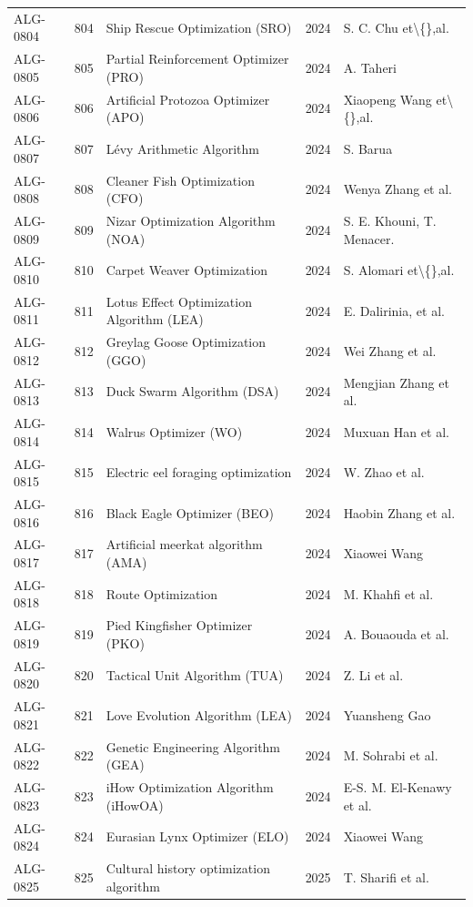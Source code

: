 \documentclass[8pt]{article}
\begin{document}
\begin{landscape}
\begin{longtable}{P{1.7cm}rP{10.0cm}rP{7.2cm}}
ALG-0804 & 804 & Ship Rescue Optimization (SRO) & 2024 & S. C. Chu et\textbackslash\{\},al. \\
ALG-0805 & 805 & Partial Reinforcement Optimizer (PRO) & 2024 & A. Taheri \\
ALG-0806 & 806 & Artificial Protozoa Optimizer (APO) & 2024 & Xiaopeng Wang et\textbackslash\{\},al. \\
ALG-0807 & 807 & Lévy Arithmetic Algorithm & 2024 & S. Barua \\
ALG-0808 & 808 & Cleaner Fish Optimization (CFO) & 2024 & Wenya Zhang et al. \\
ALG-0809 & 809 & Nizar Optimization Algorithm (NOA) & 2024 & S. E. Khouni, T. Menacer. \\
ALG-0810 & 810 & Carpet Weaver Optimization & 2024 & S. Alomari et\textbackslash\{\},al. \\
ALG-0811 & 811 & Lotus Effect Optimization Algorithm (LEA) & 2024 & E. Dalirinia, et al. \\
ALG-0812 & 812 & Greylag Goose Optimization (GGO) & 2024 & Wei Zhang et al. \\
ALG-0813 & 813 & Duck Swarm Algorithm (DSA) & 2024 & Mengjian Zhang et al. \\
ALG-0814 & 814 & Walrus Optimizer (WO) & 2024 & Muxuan Han et al. \\
ALG-0815 & 815 & Electric eel foraging optimization & 2024 & W. Zhao et al. \\
ALG-0816 & 816 & Black Eagle Optimizer (BEO) & 2024 & Haobin Zhang et al. \\
ALG-0817 & 817 & Artificial meerkat algorithm (AMA) & 2024 & Xiaowei Wang \\
ALG-0818 & 818 & Route Optimization & 2024 & M. Khahfi et al. \\
ALG-0819 & 819 & Pied Kingfisher Optimizer (PKO) & 2024 & A. Bouaouda et al. \\
ALG-0820 & 820 & Tactical Unit Algorithm (TUA) & 2024 & Z. Li et al. \\
ALG-0821 & 821 & Love Evolution Algorithm (LEA) & 2024 & Yuansheng Gao \\
ALG-0822 & 822 & Genetic Engineering Algorithm (GEA) & 2024 & M. Sohrabi et al. \\
ALG-0823 & 823 & iHow Optimization Algorithm (iHowOA) & 2024 & E-S. M. El-Kenawy et al. \\
ALG-0824 & 824 & Eurasian Lynx Optimizer (ELO) & 2024 & Xiaowei Wang \\
ALG-0825 & 825 & Cultural history optimization algorithm & 2025 & T. Sharifi et al. \\

\end{longtable}
\end{landscape}
\end{document}
